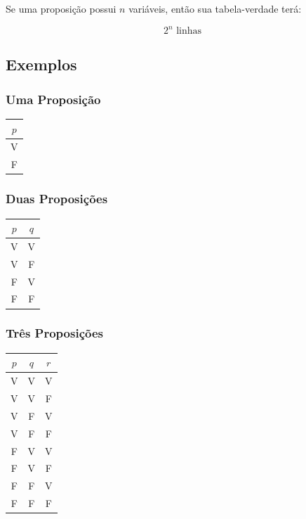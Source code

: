 Se uma proposição possui $n$ variáveis, então sua tabela-verdade terá:

\[
2^n \text{ linhas}
\]

\subsection{Exemplos}

\subsubsection{Uma Proposição}

\begin{center}
\begin{tabular}{|c|}
\hline
$p$ \\
\hline
V \\
F \\
\hline
\end{tabular}
\end{center}

\subsubsection{Duas Proposições}

\begin{center}
\begin{tabular}{|c|c|}
\hline
$p$ & $q$ \\
\hline
V & V \\
V & F \\
F & V \\
F & F \\
\hline
\end{tabular}
\end{center}

\subsubsection{Três Proposições}

\begin{center}
\begin{tabular}{|c|c|c|}
\hline
$p$ & $q$ & $r$ \\
\hline
V & V & V \\
V & V & F \\
V & F & V \\
V & F & F \\
F & V & V \\
F & V & F \\
F & F & V \\
F & F & F \\
\hline
\end{tabular}
\end{center}

